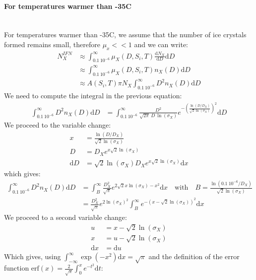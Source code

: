 \paragraph{For temperatures warmer than -35\textdegree C}
~\\
For temperatures warmer than -35\textdegree C, we assume that the number of ice crystals formed remains small, therefore $\mu_x << 1$ and we can write:
\begin{align}
 N_X^{IFN} &\approx \int_{0.1~10^{-6}}^\infty \mu_X(D,S_i,T) \frac{\mathrm{d}N_X}{\mathrm{d}D} \mathrm{d}D \\
 &\approx \int_{0.1~10^{-6}}^\infty \mu_X(D,S_i,T) n_X(D) \mathrm{d}D \\
 &\approx A(S_i,T) \pi N_X \int_{0.1~10^{-6}}^{\infty} D^2 n_X(D) \mathrm{d}D
\end{align}
We need to compute the integral in the previous equation:
\begin{align}
 \int_{0.1~10^{-6}}^{\infty} D^2 n_X(D) \mathrm{d}D &= \int_{0.1~10^{-6}}^{\infty} \frac{D^2}{\sqrt{2\pi} ~ D ~ \ln(\sigma_X)} e^{-\left( \frac{\ln(D/D_X)}{\sqrt2 \ln(\sigma_X)} \right)^2 } \mathrm{d}D
\end{align}
We proceed to the variable change:
\begin{align*}
 x &= \frac{\ln(D/D_X)}{\sqrt2 \ln(\sigma_X)} \\
 D &= D_X e^{x \sqrt2 \ln(\sigma_X)} \\
 \mathrm{d}D &= \sqrt2 \ln(\sigma_X) D_X e^{x \sqrt2 \ln(\sigma_X)} \mathrm{d}x
\end{align*}
which gives:
\begin{align}
 \int_{0.1~10^{-6}}^{\infty} D^2 n_X(D) \mathrm{d}D &= \int_{B}^{\infty} \frac{D_X^2}{\sqrt{\pi}} e^{2 \sqrt2 x \ln(\sigma_X) - x^2} \mathrm{d}x \quad \mathrm{with} \quad B = \frac{\ln(0.1~10^{-6} / D_X)}{\sqrt{2} \ln(\sigma_X)} \\
 &= \frac{D_X^2}{\sqrt{\pi}} e^{2 \ln(\sigma_X)^2} \int_{B}^{\infty} e^{-(x - \sqrt2 \ln(\sigma_X))^2} \mathrm{d}x
\end{align}
We proceed to a second variable change:
\begin{align*}
 u &= x - \sqrt2 \ln(\sigma_X) \\
 x &= u - \sqrt2 \ln(\sigma_X) \\
 \mathrm{d}x &= \mathrm{d}u
\end{align*}
Which gives, using $\int_{-\infty}^{\infty} \exp(-x^2)\mathrm{d}x = \sqrt{\pi}$ and the definition of the error function $ \mathrm{erf}(x) = \frac{2}{\sqrt \pi} \int_0^x e^{-t^2} \mathrm{d}t $:
